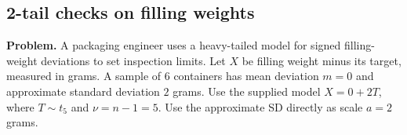 \subsection{2-tail checks on filling weights}
\label{c8-i5}
\textbf{Problem.} A packaging engineer uses a heavy-tailed model for signed filling-weight deviations to set inspection limits. Let $X$ be filling weight minus its target, measured in grams. A sample of 6 containers has mean deviation $m=0$ and approximate standard deviation $2$ grams. Use the supplied model $X=0+2T$, where $T\sim t_{5}$ and $\nu=n-1=5$. Use the approximate SD directly as scale $a=2$ grams.
